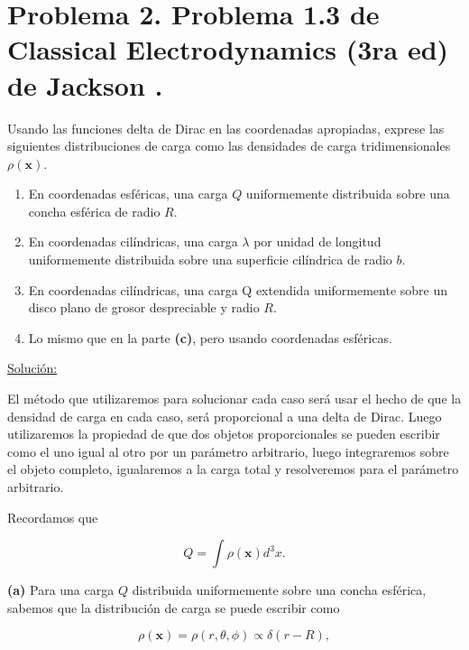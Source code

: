 \documentclass[a4paper,10pt]{article}
\numberwithin{equation}{section}
\begin{document}
\section{Problema 2. Problema 1.3 de Classical Electrodynamics (3ra ed) de 
Jackson \cite{jackson}.}

Usando las funciones delta de Dirac en las coordenadas apropiadas, exprese las 
siguientes distribuciones de carga como las densidades de carga tridimensionales 
$\rho(\mathbf{x}).$

\begin{enumerate}[label=\textbf{(\alph*)}]
 \item En coordenadas esféricas, una carga $Q$ uniformemente distribuida sobre 
 una concha esférica de radio $R$.
 \item En coordenadas cilíndricas, una carga $\lambda$ por unidad de longitud 
 uniformemente distribuida sobre una superficie cilíndrica de radio $b$.
 \item En coordenadas cilíndricas, una carga Q extendida uniformemente sobre 
 un disco plano de grosor despreciable y radio $R$.
 \item Lo mismo que en la parte \textbf{(c)}, pero usando coordenadas esféricas.
\end{enumerate}

\vspace{.3cm}

\underline{Solución:} \vspace{.3cm}

El método que utilizaremos para solucionar cada caso será usar el hecho de que 
la densidad de carga en cada caso, será proporcional a una delta de Dirac. Luego 
utilizaremos la propiedad de que dos objetos proporcionales se pueden escribir 
como el uno igual al otro por un parámetro arbitrario, luego integraremos sobre 
el objeto completo, igualaremos a la carga total y resolveremos para el parámetro 
arbitrario.

\vspace{.3cm}

Recordamos que 

\begin{equation}
 Q = \int \rho(\mathbf{x})d^3x.
\end{equation}

\textbf{(a)} Para una carga $Q$ distribuida uniformemente sobre una concha esférica, 
sabemos que la distribución de carga se puede escribir como 

\begin{equation}
 \rho(\mathbf{x}) = \rho(r,\theta,\phi) \propto \delta(r-R),
\end{equation}
\end{document}
